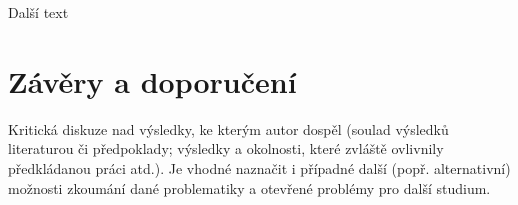 			\newpage

			Další text

\section{Závěry a doporučení}


Kritická diskuze nad výsledky, ke kterým autor dospěl (soulad výsledků  literaturou či předpoklady;
výsledky a okolnosti, které zvláště ovlivnily předkládanou práci atd.). Je vhodné naznačit i případné další
(popř. alternativní) možnosti zkoumání dané problematiky a otevřené problémy pro další studium.
